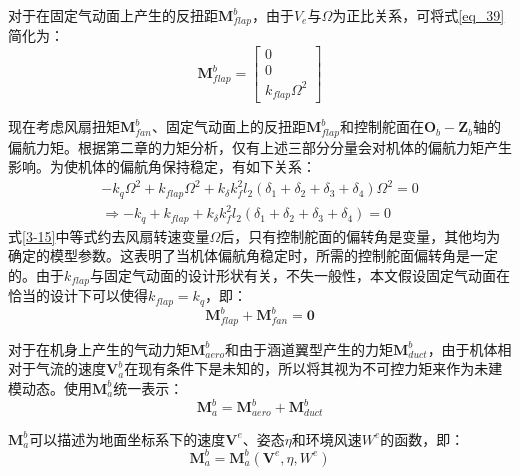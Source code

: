 对于在固定气动面上产生的反扭距$\boldsymbol{M}_{flap}^b$，由于$V_{e}$与$\Omega$为正比关系，可将式\ref{eq_39}简化为：
\begin{equation}
    \boldsymbol{M}_{flap}^b=
    \begin{bmatrix}
    0 \\0 \\k_{flap}\Omega^2
    \end{bmatrix}
    \label{3-15}
\end{equation}

现在考虑风扇扭矩$\boldsymbol{M}_{fan}^b$、固定气动面上的反扭距$\boldsymbol{M}_{flap}^b$和控制舵面在$\boldsymbol{O}_b-\boldsymbol{Z}_b$轴的偏航力矩。根据第二章的力矩分析，仅有上述三部分分量会对机体的偏航力矩产生影响。为使机体的偏航角保持稳定，有如下关系：
\begin{equation}
    \begin{gathered}
    -k_q\Omega^2+k_{flap}\Omega^2+k_{\delta}k_f^2 l_2(\delta_1 + \delta_2 + \delta_3 + \delta_4)\Omega^2=0
     \\
     \Rightarrow
    -k_q+k_{flap}+k_{\delta}k_f^2 l_2(\delta_1 + \delta_2 + \delta_3 + \delta_4)=0
    \end{gathered}
    \label{3-16}
\end{equation}
式\ref{3-15}中等式约去风扇转速变量$\Omega$后，只有控制舵面的偏转角是变量，其他均为确定的模型参数。这表明了当机体偏航角稳定时，所需的控制舵面偏转角是一定的。由于$k_{flap}$与固定气动面的设计形状有关，不失一般性，本文假设固定气动面在恰当的设计下可以使得$k_{flap}=k_{q}$，即：
\begin{equation}
    \boldsymbol{M}_{flap}^b + \boldsymbol{M}_{fan}^b = \boldsymbol{0}
\label{3-17}
\end{equation}

对于在机身上产生的气动力矩$\boldsymbol{M}_{aero}^b$和由于涵道翼型产生的力矩$\boldsymbol{M}_{duct}^b$，由于机体相对于气流的速度$\boldsymbol{V}_a^b$在现有条件下是未知的，所以将其视为不可控力矩来作为未建模动态。使用$\boldsymbol{M}_{a}^b$统一表示：
\begin{equation}
    \boldsymbol{M}_{a}^b=\boldsymbol{M}_{aero}^b+\boldsymbol{M}_{duct}^b
    \label{3-18}
\end{equation}

$\boldsymbol{M}_{a}^b$可以描述为地面坐标系下的速度$\boldsymbol{V}^e$、姿态$\eta$和环境风速$W^e$的函数，即：
\begin{equation}
    \boldsymbol{M}_{a}^b=\boldsymbol{M}_{a}^b(\boldsymbol{V}^e,\eta,W^e)
    \label{3-19}
\end{equation}

